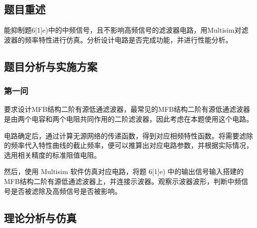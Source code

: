 \documentclass[./测控三级项目.tex]{subfiles} %
\begin{document}
	\subsection{题目重述}
	\begin{compactenum}
		\item 能抑制题6[1]e)中的中频信号，且不影响高频信号的滤波器电路，用Multisim对滤波器的频率特性进行仿真。分析设计电路是否完成功能，并进行性能分析。
	\end{compactenum}
	\subsection{题目分析与实施方案}
		\subsubsection{第一问}
			要求设计MFB结构二阶有源低通滤波器，最常见的MFB结构二阶有源低通滤波器是由两个电容和两个电阻共同作用的二阶滤波器，因此考虑在本题使用这个电路。 \par
			电路确定后，通过计算无源网络的传递函数，得到对应相频特性函数。将需要滤除的频率代入特性曲线的截止频率，便可以推算出对应电路参数，并根据实际情况，选用相关精度的标准阻值电阻。 \par
			然后，使用 Multisim 软件仿真对应电路，将题 6[1]e) 中的输出信号输入搭建的MFB结构二阶有源低通滤波器上，并连接示波器。观察示波器波形，判断中频信号是否被滤除及高频信号是否被影响。\par
				
			
	\subsection{理论分析与仿真}
\end{document}
